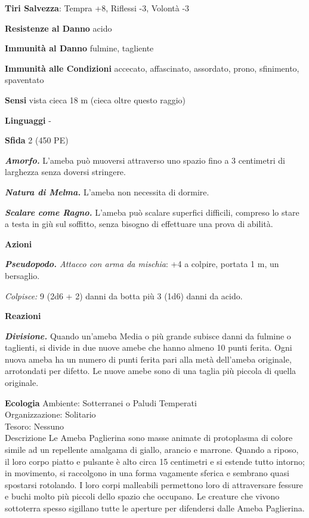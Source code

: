 \begin{multicols}{2}
\textbf{Tiri Salvezza}: Tempra +8, Riflessi -3, Volontà -3

\textbf{Resistenze al Danno} acido

\textbf{Immunità al Danno} fulmine, tagliente

\textbf{Immunità alle Condizioni} accecato, affascinato, assordato,
prono, sfinimento, spaventato

\textbf{Sensi} vista cieca 18 m (cieca oltre questo raggio)

\textbf{Linguaggi} -

\textbf{Sfida} 2 (450 PE)

\emph{\textbf{Amorfo.}} L'ameba può muoversi attraverso uno spazio fino a 3 centimetri di larghezza senza doversi stringere.

\emph{\textbf{Natura di Melma.}} L'ameba non necessita di dormire.

\emph{\textbf{Scalare come Ragno.}} L'ameba può scalare superfici
difficili, compreso lo stare a testa in giù sul soffitto, senza bisogno
di effettuare una prova di abilità.

\textbf{Azioni}

\emph{\textbf{Pseudopodo.} Attacco con arma da mischia}: +4 a colpire,
portata 1 m, un bersaglio.

\emph{Colpisce:} 9 (2d6 + 2) danni da botta più 3 (1d6) danni da
acido.

\textbf{Reazioni}

\emph{\textbf{Divisione.}} Quando un'ameba Media o più grande subisce danni da fulmine o taglienti, si divide in due nuove amebe che hanno almeno 10 punti ferita. Ogni nuova ameba ha un numero di punti ferita pari alla metà dell'ameba originale, arrotondati per difetto. Le nuove amebe sono di una taglia più piccola di quella originale.

\textbf{Ecologia}
Ambiente: Sotterranei o Paludi Temperati\\
Organizzazione: Solitario\\
Tesoro: Nessuno\\
Descrizione
Le Ameba Paglierina sono masse animate di protoplasma di colore simile ad un repellente amalgama di giallo, arancio e marrone. Quando a riposo, il loro corpo piatto e pulsante è alto circa 15 centimetri e si estende tutto intorno; in movimento, si raccolgono in una forma vagamente sferica e sembrano quasi spostarsi rotolando. I loro corpi malleabili permettono loro di attraversare fessure e buchi molto più piccoli dello spazio che occupano. Le creature che vivono sottoterra spesso sigillano tutte le aperture per difendersi dalle Ameba Paglierina.\\


\end{multicols}
